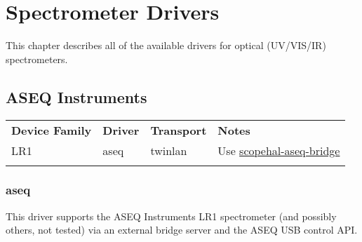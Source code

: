 \chapter{Spectrometer Drivers}
\label{sec:spec-drivers}

This chapter describes all of the available drivers for optical (UV/VIS/IR) spectrometers.

\section{ASEQ Instruments}

\begin{tabularx}{16cm}{lllX}
\thickhline
\textbf{Device Family} & \textbf{Driver} & \textbf{Transport} & \textbf{Notes} \\
\thickhline
LR1 & aseq & twinlan & Use \href{https://github.com/ngscopeclient/scopehal-aseq-bridge}{scopehal-aseq-bridge}\\
\thickhline
\end{tabularx}

\subsection{aseq}

This driver supports the ASEQ Instruments LR1 spectrometer (and possibly others, not tested) via an external bridge
server and the ASEQ USB control API.
